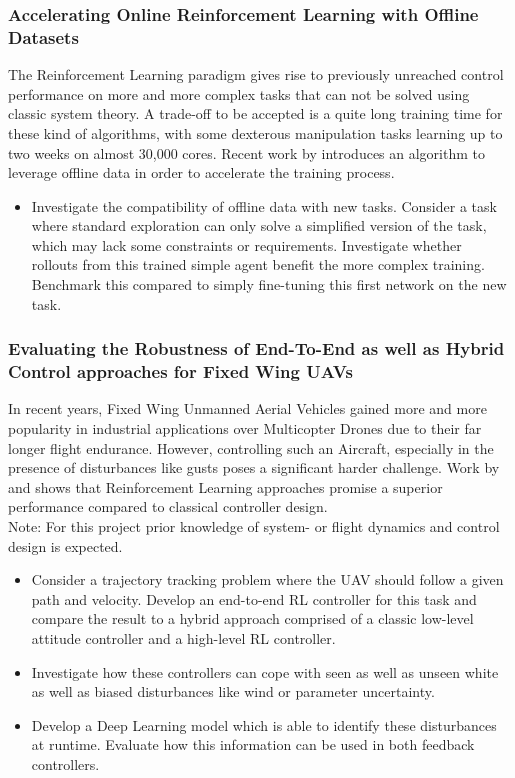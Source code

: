\documentclass[a4paper]{article}
\begin{document}
\subsubsection{Accelerating Online Reinforcement Learning with Offline Datasets}
The Reinforcement Learning paradigm gives rise to previously unreached control performance on more and more complex tasks that can not be solved using classic system theory. A trade-off to be accepted is a quite long training time for these kind of algorithms, with some dexterous manipulation tasks learning up to two weeks on almost 30,000 cores. Recent work by \cite{nair2020} introduces an algorithm to leverage offline data in order to accelerate the training process.
\begin{itemize}
\item Investigate the compatibility of offline data with new tasks. Consider a task where standard exploration can only solve a simplified version of the task, which may lack some constraints or requirements. Investigate whether rollouts from this trained simple agent benefit the more complex training. Benchmark this compared to simply fine-tuning this first network on the new task.
\end{itemize}

\subsubsection{Evaluating the Robustness of End-To-End as well as Hybrid Control approaches for Fixed Wing UAVs}
In recent years, Fixed Wing Unmanned Aerial Vehicles gained more and more popularity in industrial applications over Multicopter Drones due to their far longer flight endurance. However, controlling such an Aircraft, especially in the presence of disturbances like gusts poses a significant harder challenge. Work by \cite{Bohn2019} and \cite{kaufmann2020} shows that Reinforcement Learning approaches promise a superior performance compared to classical controller design.\\
Note: For this project prior knowledge of system- or flight dynamics and control design is expected.
\begin{itemize}
\item Consider a trajectory tracking problem where the UAV should follow a given path and velocity. Develop an end-to-end RL controller for this task and compare the result to a hybrid approach comprised of a classic low-level attitude controller and a high-level RL controller.
\item Investigate how these controllers can cope with seen as well as unseen white as well as biased disturbances like wind or parameter uncertainty.
\item Develop a Deep Learning model which is able to identify these disturbances at runtime. Evaluate how this information can be used in both feedback controllers.
\end{itemize}
\end{document}
